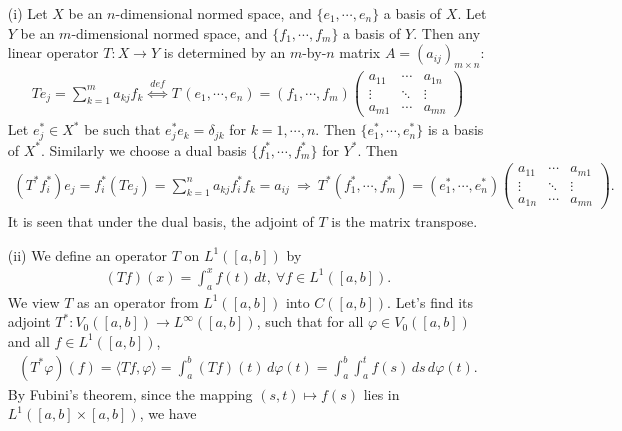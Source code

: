 \documentclass{article}
\begin{document}
\begin{itemize}
\vspace{0.1cm}
\item[(i)] Let $X$ be an $n$-dimensional normed space, and $\{e_1,\cdots,e_n\}$ a basis of $X$. Let $Y$ be an $m$-dimensional normed space, and $\{f_1,\cdots,f_m\}$ a basis of $Y$. Then any linear operator $T:X\to Y$ is determined by an $m$-by-$n$ matrix $A=(a_{ij})_{m\times n}$:
\begin{align*}
	Te_j = \sum_{k=1}^m a_{kj}f_k\ \overset{def}{\Leftrightarrow}\ T\,(e_1,\cdots,e_n) = (f_1,\cdots,f_m)\begin{pmatrix}
		a_{11} & \cdots & a_{1n}\\
		\vdots & \ddots & \vdots\\
		a_{m1} & \cdots & a_{mn}
	\end{pmatrix}
\end{align*}
Let $e_j^*\in X^*$ be such that $e_j^*e_k = \delta_{jk}$ for $k=1,\cdots,n$. Then $\{e_1^*,\cdots,e_n^*\}$ is a basis of $X^*$. Similarly we choose a dual basis $\{f_1^*,\cdots,f_m^*\}$ for $Y^*$. Then
\begin{align*}
	\left(T^*f_i^*\right)e_j = f_i^*(Te_j) = \sum_{k=1}^n a_{kj}f_i^*f_k = a_{ij}\ \Rightarrow\ T^*\left(f_1^*,\cdots,f_m^*\right) = (e_1^*,\cdots,e_n^*)\begin{pmatrix}
		a_{11} & \cdots & a_{m1}\\
		\vdots & \ddots & \vdots\\
		a_{1n} & \cdots & a_{mn}
	\end{pmatrix}.
\end{align*}
It is seen that under the dual basis, the adjoint of $T$ is the matrix transpose.
\vspace{0.1cm}
\item[(ii)] We define an operator $T$ on $L^1([a,b])$ by
\begin{align*}
	(Tf)(x) = \int_a^x f(t)\,dt,\ \forall f\in L^1([a,b]).
\end{align*}
We view $T$ as an operator from $L^1([a,b])$ into $C([a,b])$. Let's find its adjoint $T^*:V_0([a,b])\to L^\infty([a,b])$, such that for all $\varphi\in V_0([a,b])$ and all $f\in L^1([a,b])$,
\begin{align*}
	(T^*\varphi)(f) = \langle Tf,\varphi\rangle = \int_a^b(Tf)(t)\,d\varphi(t) = \int_a^b\int_a^t f(s)\,ds\,d\varphi(t).
\end{align*}
By Fubini's theorem, since the mapping $(s,t)\mapsto f(s)$ lies in $L^1([a,b]\times[a,b])$, we have
\begin{align*}

\end{align*}
\end{itemize}
\end{document}
